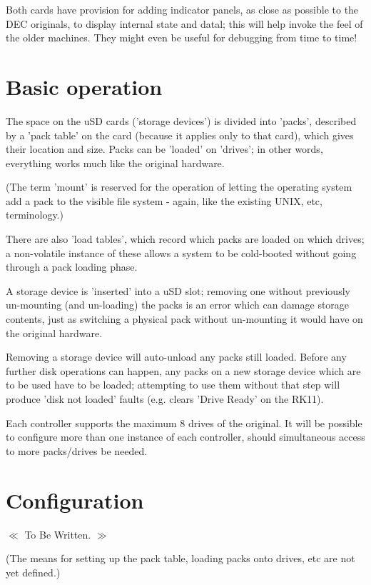 Both cards have provision for adding indicator panels, as close as possible
to the DEC originals, to display internal state and datal; this will help
invoke the feel of the older machines. They might even be useful for
debugging from time to time!

\section{Basic operation}

The space on the uSD cards ('storage devices') is divided into 'packs',
described by a 'pack table' on the card (because it applies only to that
card), which gives their location and size. Packs can be 'loaded' on
'drives'; in other words, everything works much like the original hardware.

(The term 'mount' is reserved for the operation of letting the operating
system add a pack to the visible file system - again, like the existing UNIX,
etc, terminology.)

There are also 'load tables', which record which packs are loaded on which
drives; a non-volatile instance of these allows a system to be cold-booted
without going through a pack loading phase.

A storage device is 'inserted' into a uSD slot; removing one without
previously un-mounting (and un-loading) the packs is an error which can
damage storage contents, just as switching a physical pack without
un-mounting it would have on the original hardware.

Removing a storage device will auto-unload any packs still loaded. Before any
further disk operations can happen, any packs on a new storage device which
are to be used have to be loaded; attempting to use them without that step
will produce 'disk not loaded' faults (e.g. clears 'Drive Ready' on the RK11).

Each controller supports the maximum 8 drives of the original. It will be
possible to configure more than one instance of each controller, should
simultaneous access to more packs/drives be needed.

\section{Configuration}

\begin{center}
  $\ll$ To Be Written. $\gg$
\end{center}

(The means for setting up the pack table, loading packs onto drives, etc are
not yet defined.) 

